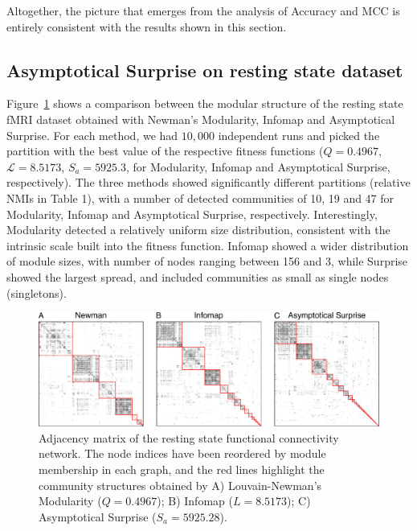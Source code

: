 Altogether, the picture that emerges from the analysis of Accuracy and MCC is entirely consistent with the results shown in this section.

\subsection{Asymptotical Surprise on resting state dataset}
Figure~\ref{fig:partitioncomparison} shows a comparison between the modular structure of the resting state fMRI dataset obtained with Newman's Modularity, Infomap and Asymptotical Surprise.
For each method, we had $10,000$ independent runs and picked the partition with the best value of the respective fitness functions ($Q=0.4967$, $\mathcal{L}=8.5173$, $S_a=5925.3$, for Modularity, Infomap and Asymptotical Surprise, respectively).
The three methods showed significantly different partitions (relative NMIs in Table 1), with a number of detected communities of 10, 19 and 47 for Modularity, Infomap and Asymptotical Surprise, respectively.
Interestingly, Modularity detected a relatively uniform size distribution, consistent with the intrinsic scale built into the fitness function.
Infomap showed a wider distribution of module sizes, with number of nodes ranging between 156 and 3, while Surprise showed the largest spread, and included communities as small as single nodes (singletons).

\begin{figure}[htb!]
\includegraphics[width=\textwidth]{images/pacopaperfigure6.pdf}
\caption{Adjacency matrix of the resting state functional connectivity network. The node indices have been reordered by module membership in each graph, and the red lines highlight the community structures obtained by A) Louvain-Newman's Modularity ($Q=0.4967$); B) Infomap ($L=8.5173$); C) Asymptotical Surprise ($S_a=5925.28$).}
\label{fig:partitioncomparison}
\end{figure}


